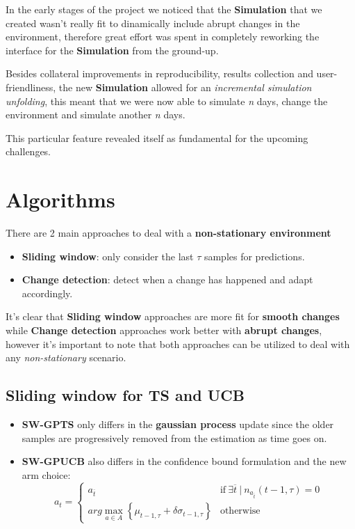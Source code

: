 In the early stages of the project we noticed that the \textbf{Simulation} that we created wasn't really fit to dinamically include abrupt changes in the environment, therefore great effort was spent in completely reworking the interface for the \textbf{Simulation} from the ground-up.

Besides collateral improvements in reproducibility, results collection and user-friendliness, the new \textbf{Simulation} allowed for an \textit{incremental simulation unfolding}, this meant that we were now able to simulate \textit{n} days, change the environment and simulate another \textit{n} days.

This particular feature revealed itself as fundamental for the upcoming challenges.

\section{Algorithms}


There are 2 main approaches to deal with a \textbf{non-stationary environment}
\begin{itemize}
    \item \textbf{Sliding window}: only consider the last $\tau$ samples for predictions.
    \item \textbf{Change detection}: detect when a change has happened and adapt accordingly.
\end{itemize}

It's clear that \textbf{Sliding window} approaches are more fit for \textbf{smooth changes} while \textbf{Change detection} approaches work better with \textbf{abrupt changes}, however it's important to note that both approaches can be utilized to deal with any \textit{non-stationary} scenario.

\subsection{Sliding window for TS and UCB}

\begin{itemize}
    \item \textbf{SW-GPTS} only differs in the \textbf{gaussian process} update since the older samples are progressively removed from the estimation as time goes on.
    \item \textbf{SW-GPUCB} also differs in the confidence bound formulation and the new arm choice:
        \begin{displaymath}
            a_t =
            \begin{cases}
                a_{\overline{t}} & \text{if} ~ \exists \overline{t} ~ | ~ n_{a_{\overline{t}}}(t-1, \tau) = 0 \\
                arg\max_{a \in A} \left\{ \mu_{t-1, \tau} + \delta \sigma_{t-1, \tau} \right\} & \text{otherwise}
            \end{cases}
        \end{displaymath}
\end{itemize}

